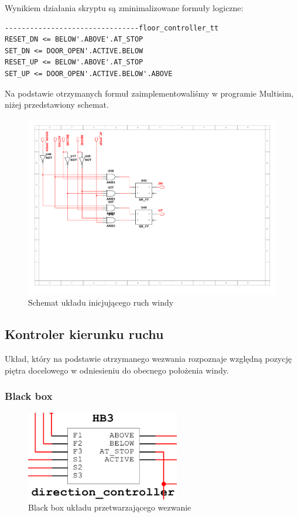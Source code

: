 \documentclass[a4paper]{article}
\begin{document}
\pagebreak
Wynikiem działania skryptu są zminimalizowane formuły logiczne:

\begin{verbatim}
--------------------------------floor_controller_tt
RESET_DN <= BELOW'.ABOVE'.AT_STOP
SET_DN <= DOOR_OPEN'.ACTIVE.BELOW
RESET_UP <= BELOW'.ABOVE'.AT_STOP
SET_UP <= DOOR_OPEN'.ACTIVE.BELOW'.ABOVE
\end{verbatim}

Na podstawie otrzymanych formuł zaimplementowaliśmy w programie Multisim,
niżej przedstawiony schemat.

\begin{figure}[H]
    \centering
    \includegraphics[width=\textwidth]{floor_controller_schemat.pdf}
    \caption{Schemat układu inicjującego ruch windy}
\end{figure}

\pagebreak
\subsection{Kontroler kierunku ruchu}

Układ, który na podstawie otrzymanego wezwania rozpoznaje względną pozycję piętra docelowego
w odniesieniu do obecnego położenia windy.

\subsubsection{Black box}
\begin{figure}[H]
    \centering
    \includegraphics[width=0.6\textwidth]{direction_controller.png}
    \caption{Black box układu przetwarzającego wezwanie}
\end{figure}
\end{document}
